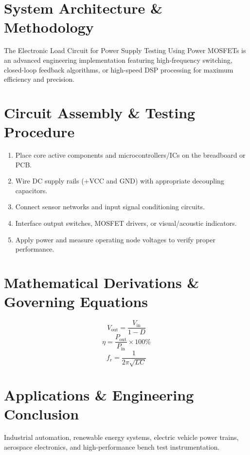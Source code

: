 \documentclass[11pt,a4paper]{article}
\begin{document}
\section{System Architecture \& Methodology}
The Electronic Load Circuit for Power Supply Testing Using Power MOSFETs is an advanced engineering implementation featuring high-frequency switching, closed-loop feedback algorithms, or high-speed DSP processing for maximum efficiency and precision.

\section{Circuit Assembly \& Testing Procedure}
\begin{enumerate}
    \item Place core active components and microcontrollers/ICs on the breadboard or PCB.
    \item Wire DC supply rails (+VCC and GND) with appropriate decoupling capacitors.
    \item Connect sensor networks and input signal conditioning circuits.
    \item Interface output switches, MOSFET drivers, or visual/acoustic indicators.
    \item Apply power and measure operating node voltages to verify proper performance.
\end{enumerate}

\section{Mathematical Derivations \& Governing Equations}
\begin{equation}
V_{\text{out}} = \frac{V_{\text{in}}}{1 - D}
\end{equation}
\begin{equation}
\eta = \frac{P_{\text{out}}}{P_{\text{in}}} \times 100\%
\end{equation}
\begin{equation}
f_r = \frac{1}{2\pi \sqrt{L C}}
\end{equation}

\section{Applications \& Engineering Conclusion}
Industrial automation, renewable energy systems, electric vehicle power trains, aerospace electronics, and high-performance bench test instrumentation.
\end{document}
